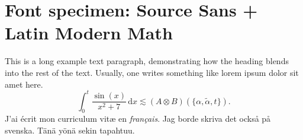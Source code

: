 \documentclass[11pt]{report}
\begin{document}
\section*{Font specimen: Source Sans + Latin Modern Math}
This is a long example text paragraph,
demonstrating how the heading blends into the rest of the text.
Usually, one writes something like lorem ipsum dolor sit amet here.
\[
\int_0^t \frac{\sin(x)}{x^2 + 7} \,\mathrm dx
\lesssim (A \otimes B)(\{ \alpha, \tilde\alpha, t \}).
\]
J'ai écrit mon curriculum vit\ae{} en \emph{fran\c{c}ais}.
Jag borde skriva det också på svenska.
Tänä yönä sekin tapahtuu.
\end{document}
